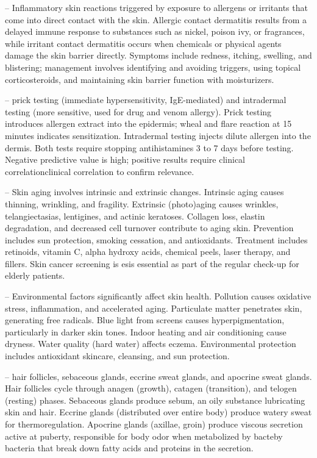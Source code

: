 -- Inflammatory skin reactions triggered by exposure to allergens or irritants that come into direct contact with the skin. Allergic contact dermatitis results from a delayed immune response to substances such as nickel, poison ivy, or fragrances, while irritant contact dermatitis occurs when chemicals or physical agents damage the skin barrier directly. Symptoms include redness, itching, swelling, and blistering; management involves identifying and avoiding triggers, using topical corticosteroids, and maintaining skin barrier function with moisturizers.

-- prick testing (immediate hypersensitivity, IgE-mediated) and intradermal testing (more sensitive, used for drug and venom allergy). Prick testing introduces allergen extract into the epidermis; wheal and flare reaction at 15 minutes indicates sensitization. Intradermal testing injects dilute allergen into the dermis. Both tests require stopping antihistamines 3 to 7 days before testing. Negative predictive value is high; positive results require clinical correlationclinical correlation to confirm relevance.

-- Skin aging involves intrinsic and extrinsic changes. Intrinsic aging causes thinning, wrinkling, and fragility. Extrinsic (photo)aging causes wrinkles, telangiectasias, lentigines, and actinic keratoses. Collagen loss, elastin degradation, and decreased cell turnover contribute to aging skin. Prevention includes sun protection, smoking cessation, and antioxidants. Treatment includes retinoids, vitamin C, alpha hydroxy acids, chemical peels, laser therapy, and fillers. Skin cancer screening is esis essential as part of the regular check-up for elderly patients.

-- Environmental factors significantly affect skin health. Pollution causes oxidative stress, inflammation, and accelerated aging. Particulate matter penetrates skin, generating free radicals. Blue light from screens causes hyperpigmentation, particularly in darker skin tones. Indoor heating and air conditioning cause dryness. Water quality (hard water) affects eczema. Environmental protection includes antioxidant skincare, cleansing, and sun protection.

-- hair follicles, sebaceous glands, eccrine sweat glands, and apocrine sweat glands. Hair follicles cycle through anagen (growth), catagen (transition), and telogen (resting) phases. Sebaceous glands produce sebum, an oily substance lubricating skin and hair. Eccrine glands (distributed over entire body) produce watery sweat for thermoregulation. Apocrine glands (axillae, groin) produce viscous secretion active at puberty, responsible for body odor when metabolized by bacteby bacteria that break down fatty acids and proteins in the secretion.

